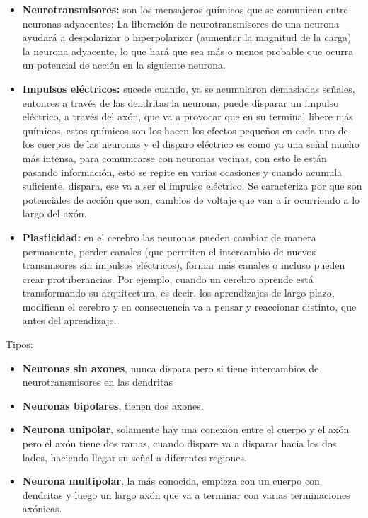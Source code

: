 \begin{itemize}
\item \textbf{Neurotransmisores:} son los mensajeros químicos que se comunican entre neuronas adyacentes; La liberación de neurotransmisores de una neurona ayudará a despolarizar o hiperpolarizar (aumentar la magnitud de la carga) la neurona adyacente, lo que hará que sea más o menos probable que ocurra un potencial de acción en la siguiente neurona.
  
\item \textbf{Impulsos eléctricos:} sucede cuando, ya se acumularon demasiadas señales, entonces a través de las dendritas la neurona, puede disparar un impulso eléctrico, a través del axón, que va a provocar que en su terminal libere más químicos, estos químicos son los hacen los efectos pequeños en cada uno de los cuerpos de las neuronas y el disparo eléctrico es como ya una señal mucho más intensa, para comunicarse con neuronas vecinas, con esto le están pasando información, esto se repite en varias ocasiones y cuando acumula suficiente, dispara, ese va a ser el impulso eléctrico. Se caracteriza por que son potenciales de acción que son, cambios de voltaje que van a ir ocurriendo a lo largo del axón.
 
\item \textbf{Plasticidad:} en el cerebro las neuronas pueden cambiar de manera permanente,   perder canales (que permiten el intercambio de nuevos transmisores sin impulsos eléctricos), formar más canales o incluso pueden crear protuberancias. Por ejemplo, cuando un cerebro aprende está transformando su arquitectura, es decir, los aprendizajes de largo plazo, modifican el cerebro y en consecuencia va a pensar y reaccionar distinto, que antes del aprendizaje.
\end{itemize}

Tipos:

\begin{itemize}
\item \textbf{Neuronas sin axones}, nunca dispara pero si tiene intercambios de neurotransmisores en las dendritas   
\item \textbf{Neuronas bipolares}, tienen dos axones. 
\item \textbf{Neurona unipolar}, solamente hay una conexión entre el cuerpo y el axón pero el axón tiene dos ramas, cuando dispare va a disparar hacia los dos lados, haciendo llegar su señal a diferentes regiones. 
\item \textbf{Neurona multipolar}, la más conocida, empieza con un cuerpo con dendritas y luego un largo axón que va a terminar con varias terminaciones axónicas. 
\end{itemize}

